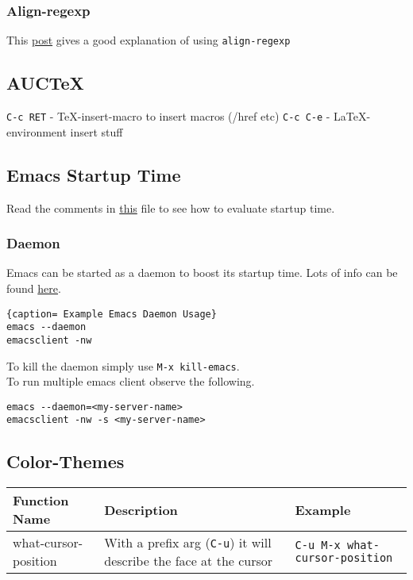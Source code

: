 \documentclass[12pt, letterpaper]{article}
\def\code#1{\texttt{#1}}
\begin{document}
\subsubsection{Align-regexp}
This \href{https://emacs.stackexchange.com/questions/2644/understanding-of-emacs-align-regexp}{post} gives a good explanation of using \code{align-regexp}

\subsection{AUCTeX}
\code{C-c RET} - TeX-insert-macro to insert macros (/href etc)
\code{C-c C-e} - LaTeX-environment insert stuff

\subsection{Emacs Startup Time}
Read the comments in \href{https://github.com/abo-abo/profile-dotemacs/blob/master/profile-dotemacs.el}{this} file to see how to evaluate startup time. \\
\subsubsection{Daemon}
Emacs can be started as a daemon to boost its startup time. Lots of info can be found \href{https://www.emacswiki.org/emacs/EmacsAsDaemon#toc12}{here}.
\begin{lstlisting}{caption= Example Emacs Daemon Usage}
emacs --daemon
emacsclient -nw
\end{lstlisting}
To kill the daemon simply use \code{M-x kill-emacs}. \\
To run multiple emacs client observe the following.
\begin{lstlisting}
emacs --daemon=<my-server-name> 
emacsclient -nw -s <my-server-name>
\end{lstlisting}

\subsection{Color-Themes}
\begin{tabular} {|L{0.2\textwidth}|L{0.4\textwidth}|L{0.4\textwidth}|}
  \hline
  \textbf{Function Name} &
  \textbf{Description} &
  \textbf{Example} \\\hline\hline
  what-cursor-position & With a prefix arg (\code{C-u}) it will describe the face at the cursor & \code{C-u M-x what-cursor-position} \\\hline
\end{tabular}
\end{document}
